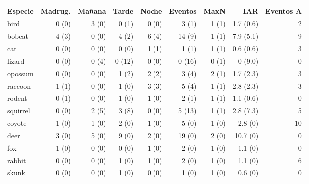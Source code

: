 \begin{tabular}{lrrrrrrrr}
\toprule
Especie & Madrug. & Mañana & Tarde & Noche & Eventos & MaxN & IAR & Eventos A \\
\midrule
bird & 0 (0) & 3 (0) & 0 (1) & 0 (0) & 3 (1) & 1 (1) & 1.7 (0.6) & 2 \\
bobcat & 4 (3) & 0 (0) & 4 (2) & 6 (4) & 14 (9) & 1 (1) & 7.9 (5.1) & 9 \\
cat & 0 (0) & 0 (0) & 0 (0) & 1 (1) & 1 (1) & 1 (1) & 0.6 (0.6) & 3 \\
lizard & 0 (0) & 0 (4) & 0 (12) & 0 (0) & 0 (16) & 0 (1) & 0 (9.0) & 0 \\
opossum & 0 (0) & 0 (0) & 1 (2) & 2 (2) & 3 (4) & 2 (1) & 1.7 (2.3) & 3 \\
raccoon & 1 (1) & 0 (0) & 1 (0) & 3 (3) & 5 (4) & 1 (1) & 2.8 (2.3) & 3 \\
rodent & 0 (1) & 0 (0) & 1 (0) & 1 (0) & 2 (1) & 1 (1) & 1.1 (0.6) & 0 \\
squirrel & 0 (0) & 2 (5) & 3 (8) & 0 (0) & 5 (13) & 1 (1) & 2.8 (7.3) & 5 \\
coyote & 1 (0) & 1 (0) & 2 (0) & 1 (0) & 5 (0) & 1 (0) & 2.8 (0) & 10 \\
deer & 3 (0) & 5 (0) & 9 (0) & 2 (0) & 19 (0) & 2 (0) & 10.7 (0) & 0 \\
fox & 1 (0) & 0 (0) & 0 (0) & 1 (0) & 2 (0) & 1 (0) & 1.1 (0) & 0 \\
rabbit & 0 (0) & 0 (0) & 1 (0) & 1 (0) & 2 (0) & 1 (0) & 1.1 (0) & 6 \\
skunk & 0 (0) & 0 (0) & 1 (0) & 0 (0) & 1 (0) & 1 (0) & 0.6 (0) & 0 \\
\bottomrule
\end{tabular}
